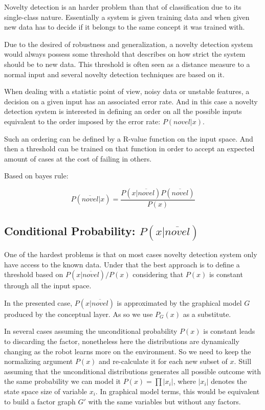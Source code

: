 \documentclass[runningheads,a4paper]{llncs}
\begin{document}
Novelty detection is an harder problem than that of classification due to its single-class nature.
Essentially a system is given training data and when given new data has to decide if it belongs
to the same concept it was trained with.

Due to the desired of robustness and generalization, a novelty detection system would always possess
some threshold that describes on how strict the system should be to new data.
This threshold is often seen as a distance measure to a normal input and several novelty detection
techniques are based on it.

When dealing with a statistic point of view, noisy data or unstable features, a decision on a given input has
an associated error rate. And in this case a novelty detection system is interested in defining an order
on all the possible inputs equivalent to the order imposed by the error rate: $P(novel|x)$.

Such an ordering can be defined by a R-value function on the input space. And then a threshold can be trained
on that function in order to accept an expected amount of cases at the cost of failing in others.

Based on bayes rule:

\begin{equation}
P(\overline{novel}|x) = \frac{P(x|\overline{novel}) P(\overline{novel})}{P(x)}
\end{equation}

\subsection{Conditional Probability: $P(x|\overline{novel})$}
One of the hardest problems is that on most cases novelty detection system only have access to 
the known data.
Under that the best approach is to define a threshold based on $P(x|\overline{novel})/P(x)$
considering that $P(x)$ is constant through all the input space.

In the presented case, $P(x|\overline{novel})$ is approximated by the graphical model $G$ produced
by the conceptual layer. As so we use $P_G(x)$ as a substitute.

\label{sec:uniform-unconditional}
In several cases assuming the unconditional probability $P(x)$ is constant leads to discarding the factor,
nonetheless here the distributions are dynamically changing as the robot learns more on the environment.
So we need to keep the normalizing argument $P(x)$ and re-calculate it for each new subset of $x$.
Still assuming that the unconditional distributions generates all possible outcome with the same probability
we can model it $P(x)=\prod{|x_i|}$, where $|x_i|$ denotes the state space size of variable $x_i$.
In graphical model terms, this would be equivalent to build a factor graph $G'$ with the same variables but
without any factors.
\end{document}
